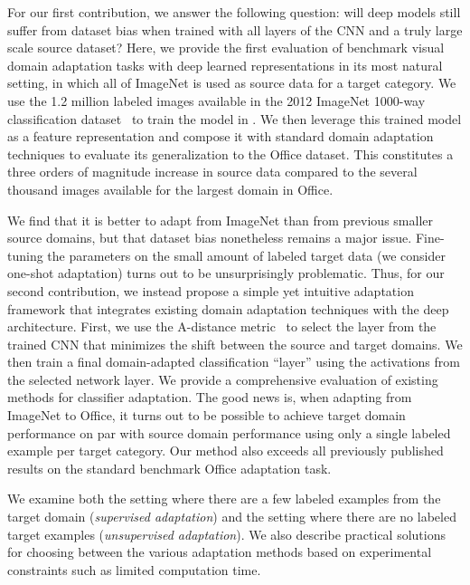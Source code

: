 For our first contribution, we answer the following question: will deep models still suffer from dataset
bias when trained with all layers of the CNN and a truly large scale source
dataset?
Here, we provide the first evaluation of benchmark visual domain adaptation
tasks with deep learned representations in its most natural setting, in which
all of ImageNet is used as source data for a target category.  We use the 1.2
million labeled images available in the 2012 ImageNet 1000-way classification
dataset~\cite{ilsvrc2012} to train the model in \cite{supervision}.  We then
leverage this trained model as a feature representation and compose it with
standard domain adaptation techniques to evaluate its generalization to the
Office dataset.  This constitutes a three orders of magnitude increase in source
data compared to the several thousand images available for the largest domain in
Office.

We find that it is better to adapt from ImageNet than from previous smaller
source domains, but that dataset bias nonetheless remains a major
issue. Fine-tuning the parameters on the small amount of labeled target data (we
consider one-shot adaptation) turns out to be unsurprisingly problematic. Thus,
for our second contribution, we instead propose a simple yet intuitive
adaptation framework that integrates existing domain adaptation techniques with
the deep architecture.  First, we use the A-distance metric~\cite{adist} to
select the layer from the trained CNN that minimizes the shift between the source
and target domains.  We then train a final domain-adapted classification
``layer'' using the activations from the selected network layer.  We provide a
comprehensive evaluation of existing methods for classifier adaptation.  The
good news is, when adapting from ImageNet to Office, it turns out to be possible
to achieve target domain performance on par with source domain performance using
only a single labeled example per target category.  Our method also exceeds all
previously published results on the standard benchmark Office adaptation task.

We examine both the setting where there are a few labeled examples from the target domain (\emph{supervised adaptation}) and the setting where there are no labeled target examples (\emph{unsupervised adaptation}). We also describe practical solutions for choosing between the various adaptation methods based on experimental constraints such as limited computation time. 
